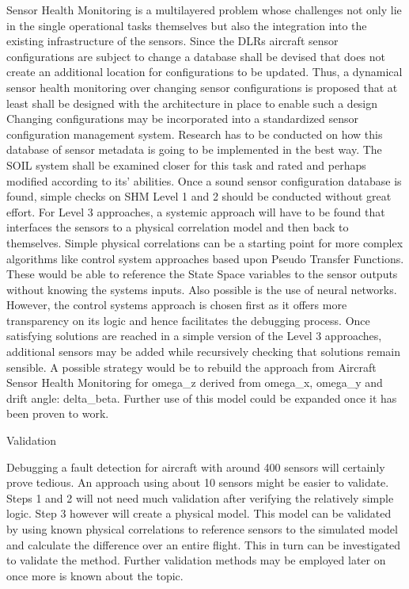 Sensor Health Monitoring is a multilayered problem whose challenges not only lie in the single operational tasks themselves but also the integration into the existing infrastructure of the sensors. Since the DLRs aircraft sensor configurations are subject to change a database shall be devised that does not create an additional location for configurations to be updated. Thus, a dynamical sensor health monitoring over changing sensor configurations is proposed that at least shall be designed with the architecture in place to enable such a design
Changing configurations may be incorporated into a standardized sensor configuration management system. Research has to be conducted on how this database of sensor metadata is going to be implemented in the best way. The SOIL system shall be examined closer for this task and rated and perhaps modified according to its’ abilities.
Once a sound sensor configuration database is found, simple checks on SHM Level 1 and 2 should be conducted without great effort. For Level 3 approaches, a systemic approach will have to be found that interfaces the sensors to a physical correlation model and then back to themselves. Simple physical correlations can be a starting point for more complex algorithms like control system approaches based upon Pseudo Transfer Functions. These would be able to reference the State Space variables to the sensor outputs without knowing the systems inputs. Also possible is the use of neural networks. However, the control systems approach is chosen first as it offers more transparency on its logic and hence facilitates the debugging process.
Once satisfying solutions are reached in a simple version of the Level 3 approaches, additional sensors may be added while recursively checking that solutions remain sensible. A possible strategy would be to rebuild the approach from Aircraft Sensor Health Monitoring for omega_z derived from omega_x, omega_y and drift angle: delta_beta. Further use of this model could be expanded once it has been proven to work.


Validation

Debugging a fault detection for aircraft with around 400 sensors will certainly prove tedious. An approach using about 10 sensors might be easier to validate. Steps 1 and 2 will not need much validation after verifying the relatively simple logic. Step 3 however will create a physical model. This model can be validated by using known physical correlations to reference sensors to the simulated model and calculate the difference over an entire flight. This in turn can be investigated to validate the method. Further validation methods may be employed later on once more is known about the topic.


